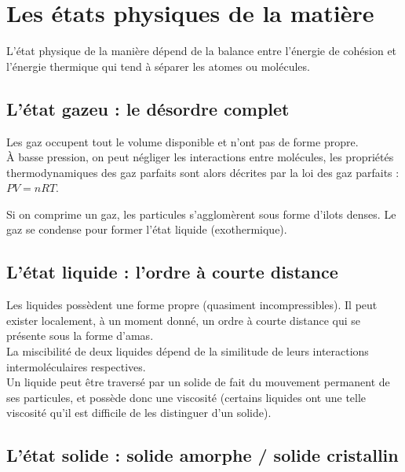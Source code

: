 \documentclass[13pt, twoside, a4paper, french, tikz]{report}
\begin{document}
\chapter{Les états physiques de la matière}\label{ch:les-etats-physiques-de-la-matiere}
  
  L'état physique de la manière dépend de la balance entre l'énergie de cohésion et l'énergie thermique qui tend à séparer les atomes ou molécules.
  
  
  \section{L'état gazeu : le désordre complet}\label{sec:l'etat-gazeu-:-le-desordre-complet}
    
    Les gaz occupent tout le volume disponible et n'ont pas de forme propre.\\
    
    À basse pression, on peut négliger les interactions entre molécules, les propriétés thermodynamiques des gaz parfaits sont alors décrites par la loi des gaz parfaits : $PV = nRT$.
    
    Si on comprime un gaz, les particules s'agglomèrent sous forme d'ilots denses.
    Le gaz se condense pour former l'état liquide (exothermique).
  
  
  \section{L'état liquide : l'ordre à courte distance}\label{sec:l'etat-liquide-:-l'ordre-a-courte-distance}
    
    Les liquides possèdent une forme propre (quasiment incompressibles).
    Il peut exister localement, à un moment donné, un ordre à courte distance qui se présente sous la forme d'amas.\\
    
    La miscibilité de deux liquides dépend de la similitude de leurs interactions intermoléculaires respectives.\\
    Un liquide peut être traversé par un solide de fait du mouvement permanent de ses particules, et possède donc une viscosité (certains liquides ont une telle viscosité qu'il est difficile de les distinguer d'un solide).
  
  
  \section{L'état solide : solide amorphe / solide cristallin}\label{sec:l'etat-solide-:-solide-amorphe-/-solide-cristallin}
    
\end{document}
